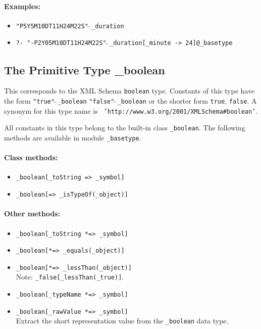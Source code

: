 \documentclass[11pt]{article}
\begin{document}
\paragraph{Examples:}
\begin{itemize}
\item {\tt "P5Y5M10DT11H24M22S"$\hat{~}\hat{~}$\_duration} 
\item {\tt ?- "-P2Y05M10DT11H24M22S"$\hat{~}\hat{~}$\_duration[\_minute -> 24]@\_basetype}
\end{itemize}

\subsection{ The Primitive Type \_boolean}

This corresponds to the XML Schema {\tt boolean}  type.
Constants of this type have the form 
{\tt "true"$\hat{~}\hat{~}$\_boolean}  {\tt "false"$\hat{~}\hat{~}$\_boolean} 
or the shorter form {\tt true}, {\tt false}. 
A synonym for this type name is {\tt
  'http://www.w3.org/2001/XMLSchema\#boolean'}.

All constants in this type belong to the built-in class {\tt \_boolean}. 
The following methods are available in module {\tt \_basetype}. 
\paragraph{Class methods:}
\begin{itemize}
    \item {\tt \_boolean[\_toString => \_symbol]}  
    \item {\tt \_boolean[=> \_isTypeOf(\_object)]}  
\end{itemize}

\paragraph{Other methods:}
\begin{itemize}
\item {\tt \_boolean[\_toString *=> \_symbol]}  
\item {\tt \_boolean[*=> \_equals(\_object)]}  
\item {\tt \_boolean[*=> \_lessThan(\_object)]}\\  
  Note: {\tt \_false[\_lessThan(\_true)]}. 
\item {\tt \_boolean[\_typeName *=> \_symbol]}  
\item {\tt \_boolean[\_rawValue *=> \_symbol]}
  \\
  Extract the short representation value from
  the {\tt \_boolean} data type. 
\end{itemize}
\end{document}
